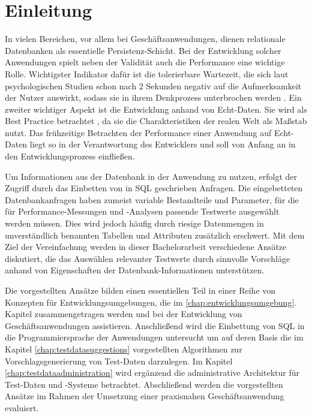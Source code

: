 \section{Einleitung}\label{chap:introduction}

%
%

In vielen Bereichen, vor allem bei Geschäftsanwendungen, dienen relationale Datenbanken als essentielle Persistenz-Schicht.
Bei der Entwicklung solcher Anwendungen spielt neben der Validität auch die Performance eine wichtige Rolle.
Wichtigster Indikator dafür ist die tolerierbare Wartezeit, die sich laut psychologischen Studien schon nach 2 Sekunden negativ auf die Aufmerksamkeit der Nutzer auswirkt, sodass sie in ihrem Denkprozess unterbrochen werden \cite{Nah04}.
Ein zweiter wichtiger Aspekt ist die Entwicklung anhand von Echt-Daten.
Sie wird als Best Practice betrachtet \cite[S. 212]{Plattner:2013:CID:2490529}, da sie die Charakteristiken der realen Welt als Maßstab nutzt.
Das frühzeitige Betrachten der Performance einer Anwendung auf Echt-Daten liegt so in der Verantwortung des Entwicklers und soll von Anfang an in den Entwicklungsprozess einfließen.

Um Informationen aus der Datenbank in der Anwendung zu nutzen, erfolgt der Zugriff durch das Einbetten von in SQL geschrieben Anfragen.
Die eingebetteten Datenbankanfragen haben zumeist variable Bestandteile und Parameter, für die für Performance-Messungen und -Analysen passende Testwerte ausgewählt werden müssen.
Dies wird jedoch häufig durch riesige Datenmengen in unverständlich benannten Tabellen und Attributen zusätzlich erschwert.
Mit dem Ziel der Vereinfachung werden in dieser Bachelorarbeit verschiedene Ansätze diskutiert, die das Auswählen relevanter Testwerte durch sinnvolle Vorschläge anhand von Eigenschaften der Datenbank-Informationen unterstützen.

Die vorgestellten Ansätze bilden einen essentiellen Teil in einer Reihe von Konzepten für Entwicklungsumgebungen, die im \ref{chap:entwicklungsumgebung}. Kapitel zusammengetragen werden und bei der Entwicklung von Geschäftsanwendungen assistieren.
Anschließend wird die Einbettung von SQL in die Programmiersprache der Anwendungen untersucht um auf deren Basis die im Kapitel \ref{chap:testdatasuggestions} vorgestellten Algorithmen zur Vorschlagsgenerierung von Test-Daten darzulegen.
Im Kapitel \ref{chap:testdataadministration} wird ergänzend die administrative Architektur für Test-Daten und -Systeme betrachtet.
Abschließend werden die vorgestellten Ansätze im Rahmen der Umsetzung einer praxisnahen Geschäftsanwendung evaluiert.